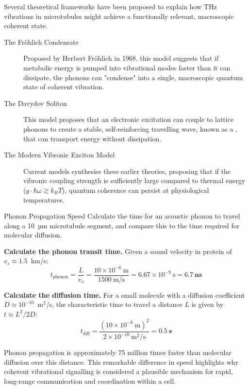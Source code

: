 Several theoretical frameworks have been proposed to explain how THz vibrations in microtubules might achieve a functionally relevant, macroscopic coherent state.
\begin{description}
    \item[The Fröhlich Condensate] Proposed by Herbert Fröhlich in 1968, this model suggests that if metabolic energy is pumped into vibrational modes faster than it can dissipate, the phonons can "condense" into a single, macroscopic quantum state of coherent vibration.
    \item[The Davydov Soliton] This model proposes that an electronic excitation can couple to lattice phonons to create a stable, self-reinforcing travelling wave, known as a , that can transport energy without dissipation.
    \item[The Modern Vibronic Exciton Model] Current models synthesise these earlier theories, proposing that if the vibronic coupling strength is sufficiently large compared to thermal energy (\(g \cdot \hbar\omega \gtrsim k_B T\)), quantum coherence can persist at physiological temperatures.
\end{description}

\begin{workedexample}{Phonon Propagation Speed}
     Calculate the time for an acoustic phonon to travel along a 10~µm microtubule segment, and compare this to the time required for molecular diffusion.
    
    \begin{derivationsteps}
        \step \textbf{Calculate the phonon transit time.} Given a sound velocity in protein of $v_s \approx 1.5$~km/s:
        \[ t_{\text{phonon}} = \frac{L}{v_s} = \frac{10 \times 10^{-6}~\text{m}}{1500~\text{m/s}} = 6.67 \times 10^{-9}~\text{s} = \mathbf{6.7~\text{ns}} \]
        
        \step \textbf{Calculate the diffusion time.} For a small molecule with a diffusion coefficient $D \approx 10^{-10}$~m$^2$/s, the characteristic time to travel a distance $L$ is given by $t \approx L^2 / 2D$:
        \[ t_{\text{diff}} = \frac{(10 \times 10^{-6}~\text{m})^2}{2 \times 10^{-10}~\text{m}^2\text{/s}} = \mathbf{0.5~\text{s}} \]
    \end{derivationsteps}

     Phonon propagation is approximately 75 million times faster than molecular diffusion over this distance. This remarkable difference in speed highlights why coherent vibrational signalling is considered a plausible mechanism for rapid, long-range communication and coordination within a cell.
\end{workedexample}

